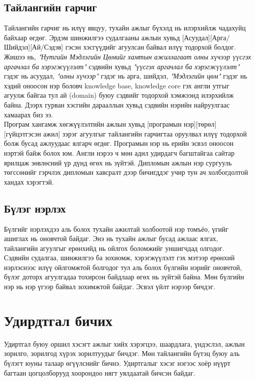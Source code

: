 \subsection{Тайлангийн гарчиг}
Тайлангийн гарчиг нь илүү явцуу, тухайн ажлыг бүхэлд нь илэрхийлж чадахуйц байхаар өгдөг. Эрдэм шинжилгээ судалгааны ажлын хувьд [Асуудал][Арга/Шийдэл][Ай/Сэдэв] гэсэн хэсгүүдийг агуулсан байвал илүү тодорхой болдог. Жишээ нь, \textit{"Нутгийн Мэдлэгийн Цөмийг хамтын ажиллагаат олны хүчээр үүсгэх аргачлал ба хэрэгжүүлэлт"} сэдвийн хувьд \textit{"үүсгэх аргачлал ба хэрэгжүүлэлт"} гэдэг нь асуудал, \textit{"олны хүчээр"} гэдэг нь арга, шийдэл, \textit{"Мэдлэгийн цөм"} гэдэг нь хэдий оноосон нэр боловч knowledge base, knowledge core гэх англи утгыг агуулж байгаа тул ай (domain) буюу сэдвийг тодорхой хэмжээнд илэрхийлж байна. Дээрх гурван хэсгийн дарааллын хувьд сэдвийн нэрийн найруулгаас хамаарах биз ээ.
\\Програм хангамж хөгжүүлэлтийн ажлын хувьд [програмын нэр][төрөл][гүйцэтгэсэн ажил] зэрэг агуулгыг тайлангийн гарчигтаа оруулвал илүү тодорхой болж бусад ажлуудаас ялгарч өгдөг. Програмын нэр нь ерийн эсвэл оноосон нэртэй байж болох юм. 
Англи нэрээ ч мөн адил удирдагч багштайгаа сайтар ярилцаж зөвлөсний үр дүнд өгөх нь зүйтэй. Дипломын ажлын нэр сургууль төгссөнийг гэрчлэх дипломын хавсралт дээр бичигддэг учир тун ач холбогдолтой хандах хэрэгтэй.

\subsection{Бүлэг нэрлэх}
Бүлгийг нэрлэхдээ аль болох тухайн ажилтай холбоотой нэр томъёо, үгийг ашиглах нь оновчтой байдаг. Энэ нь тухайн ажлыг бусад ажлаас ялгах, тайлангийн агуулгыг ерөнхийд нь ойлгох боломжийг уншигчдад олгодог. Сэдвийн судалгаа, шинжилгээ ба зохиомж, хэрэгжүүлэлт гэх мэтээр ерөнхий нэрлэснээс илүү ойлгомжтой болгодог тул аль болох бүлгийн нэрийг оновчтой, бүлэг доторх агуулгадаа тохирсон байдлаар өгөх нь зүйтэй байна. Мөн бүлгийн нэр нь нэр үгээр байвал зохимжтой байдаг. Эсвэл үйлт нэрээр бичдэг.

\section{Удирдтгал бичих}
Удиртгал буюу оршил хэсэгт ажлыг хийх хэрэгцээ, шаардлага, үндэслэл, ажлын зорилго, зорилгод хүрэх зорилтуудыг бичдэг. Мөн тайлангийн бүтэц буюу аль бүлэгт юуны талаар өгүүлснийг бичнэ. Удиртгалыг хэсэг нэгээс хоёр нүүрт багтаан цогцолборууд хоорондоо нягт уялдаатай бичсэн байдаг.

